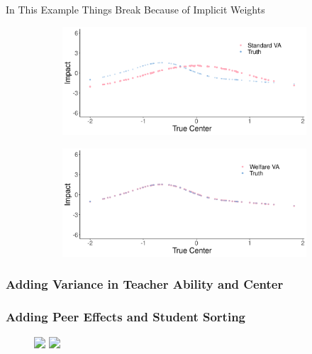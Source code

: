 \documentclass[t,aspectratio=169,11pt]{beamer}
\begin{document}
\begin{frame}{In This Example Things Break Because of Implicit Weights}

\vfill

\begin{figure}
\centering
\begin{subfigure}{.5\textwidth}
  \centering
  \includegraphics[width=\linewidth]{slides/CIERS_Figures/standard_cent_run_2.png}
\end{subfigure}%
\begin{subfigure}{.5\textwidth}
  \centering
  \includegraphics[width=\linewidth]{slides/CIERS_Figures/welfare_cent_run_2.png}
\end{subfigure}
\end{figure}

\end{frame}



\begin{frame}
\frametitle<1>{Adding Variance in Teacher Ability and Center}
\frametitle<2>{Adding Peer Effects and Student Sorting}
\vfill
\begin{figure}
    \centering
 \includegraphics<1>[width=.75\textwidth]{slides/CIERS_Figures/hist_run_4.png}

 
 \includegraphics<2>[width=.75\textwidth]{slides/CIERS_Figures/hist_run_6.png}
\end{figure}


\end{frame}
\end{document}
